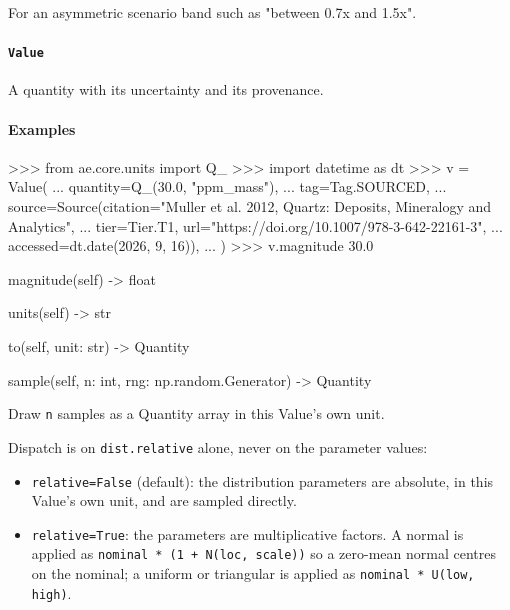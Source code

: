 \documentclass[10pt,a4paper,twoside]{report}
\begin{document}
For an asymmetric scenario band such as "between 0.7x and 1.5x".

\paragraph{\texttt{Value}}

A quantity with its uncertainty and its provenance.

\paragraph*{Examples}

\begin{doctestblock}
>>> from ae.core.units import Q_
>>> import datetime as dt
>>> v = Value(
...     quantity=Q_(30.0, "ppm_mass"),
...     tag=Tag.SOURCED,
...     source=Source(citation="Muller et al. 2012, Quartz: Deposits, Mineralogy and Analytics",
...                   tier=Tier.T1, url="https://doi.org/10.1007/978-3-642-22161-3",
...                   accessed=dt.date(2026, 9, 16)),
... )
>>> v.magnitude
30.0
\end{doctestblock}

\begin{verbatimsmall}
magnitude(self) -> float
\end{verbatimsmall}

\begin{verbatimsmall}
units(self) -> str
\end{verbatimsmall}

\begin{verbatimsmall}
to(self, unit: str) -> Quantity
\end{verbatimsmall}

\begin{verbatimsmall}
sample(self, n: int, rng: np.random.Generator) -> Quantity
\end{verbatimsmall}

Draw \texttt{n} samples as a Quantity array in this Value's own unit.

Dispatch is on \texttt{dist.relative} alone, never on the parameter values:

\begin{itemize}
\item \texttt{relative=False} (default): the distribution parameters are absolute, in this Value's own unit, and are sampled directly.
\item \texttt{relative=True}: the parameters are multiplicative factors. A normal is applied as \texttt{nominal * (1 + N(loc, scale))} so a zero-mean normal centres on the nominal; a uniform or triangular is applied as \texttt{nominal * U(low, high)}.
\end{itemize}
\end{document}
